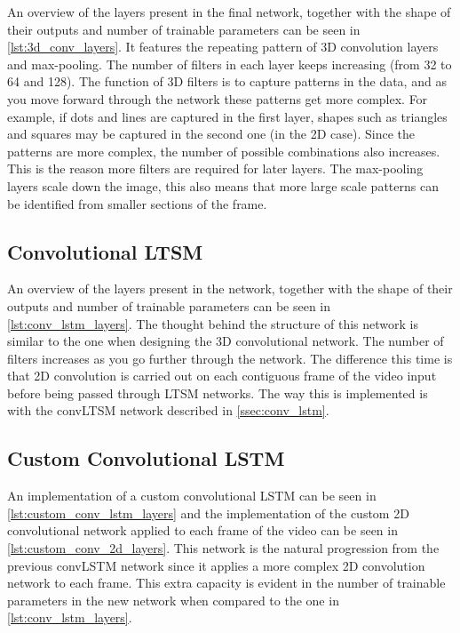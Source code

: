 An overview of the layers present in the final network, together with the shape of their outputs and number of trainable parameters can be seen in \cref{lst:3d_conv_layers}. It features the repeating pattern of 3D convolution layers and max-pooling. The number of filters in each layer keeps increasing (from 32 to 64 and 128). The function of 3D filters is to capture patterns in the data, and as you move forward through the network these patterns get more complex. For example, if dots and lines are captured in the first layer, shapes such as triangles and squares may be captured in the second one (in the 2D case). Since the patterns are more complex, the number of possible combinations also increases. This is the reason more filters are required for later layers. The max-pooling layers scale down the image, this also means that more large scale patterns can be identified from smaller sections of the frame.

\subsection{Convolutional LTSM}

An overview of the layers present in the network, together with the shape of their outputs and number of trainable parameters can be seen in \cref{lst:conv_lstm_layers}. The thought behind the structure of this network is similar to the one when designing the 3D convolutional network. The number of filters increases as you go further through the network. The difference this time is that 2D convolution is carried out on each contiguous frame of the video input before being passed through LTSM networks. The way this is implemented is with the convLTSM network described in \cref{ssec:conv_lstm}.

\subsection{Custom Convolutional LSTM}

An implementation of a custom convolutional LSTM can be seen in \cref{lst:custom_conv_lstm_layers} and the implementation of the custom 2D convolutional network applied to each frame of the video can be seen in \cref{lst:custom_conv_2d_layers}. This network is the natural progression from the previous convLSTM network since it applies a more complex 2D convolution network to each frame. This extra capacity is evident in the number of trainable parameters in the new network when compared to the one in \cref{lst:conv_lstm_layers}.

